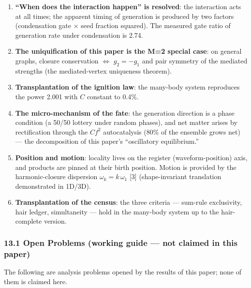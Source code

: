 \documentclass[
  a4paper,
]{article}
\newcounter{none} %
\providecommand{\tightlist}{%
  \setlength{\itemsep}{0pt}\setlength{\parskip}{0pt}}
\begin{document}
\begin{enumerate}
\def\labelenumi{\arabic{enumi}.}
\tightlist
\item
  \textbf{``When does the interaction happen'' is resolved}: the
  interaction acts at all times; the apparent timing of generation is
  produced by two factors (condensation gate \(\times\) seed fraction
  squared). The measured gate ratio of generation rate under
  condensation is 2.74.
\item
  \textbf{The uniquification of this paper is the M=2 special case}: on
  general graphs, closure conservation \(\Leftrightarrow\) \(g_2=-g_1\)
  and pair symmetry of the mediated strengths (the mediated-vertex
  uniqueness theorem).
\item
  \textbf{Transplantation of the ignition law}: the many-body system
  reproduces the power 2.001 with \(C\) constant to 0.4\%.
\item
  \textbf{The micro-mechanism of the fate}: the generation direction is
  a phase condition (a 50/50 lottery under random phases), and net
  matter arises by rectification through the \(C f^2\) autocatalysis
  (80\% of the ensemble grows net) --- the decomposition of this paper's
  ``oscillatory equilibrium.''
\item
  \textbf{Position and motion}: locality lives on the register
  (waveform-position) axis, and products are pinned at their birth
  position. Motion is provided by the harmonic-closure dispersion
  \(\omega_k = k\,\omega_1\) {[}3{]} (shape-invariant translation
  demonstrated in 1D/3D).
\item
  \textbf{Transplantation of the census}: the three criteria ---
  sum-rule exclusivity, hair ledger, simultaneity --- hold in the
  many-body system up to the hair-complete version.
\end{enumerate}

\subsubsection{13.1 Open Problems (working guide --- not claimed in this
paper)}\label{open-problems-working-guide-not-claimed-in-this-paper}

The following are analysis problems opened by the results of this paper;
none of them is claimed here.
\end{document}
